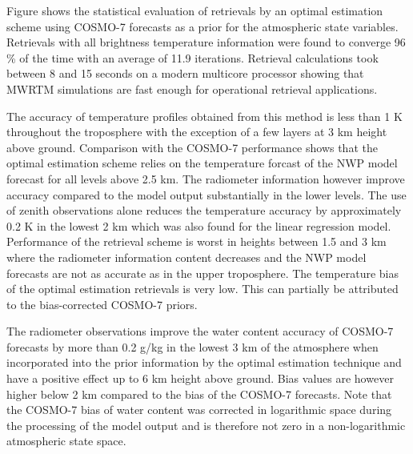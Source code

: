 \stopsubsection

\startsubsection[title={Optimal Estimation Retrievals with COSMO-7 Prior}]

    Figure  shows the statistical evaluation of retrievals
    by an optimal estimation scheme using COSMO-7 forecasts as a prior for
    the atmospheric state variables. Retrievals with all brightness temperature
    information were found to converge 96 \% of the time with an average of
    11.9 iterations. Retrieval calculations took between 8 and 15 seconds on a
    modern multicore processor showing that MWRTM simulations are fast enough
    for operational retrieval applications.

        {}

    The accuracy of temperature profiles obtained from this method is less than
    1 K throughout the troposphere with the exception of a few layers at 3 km
    height above ground. Comparison with the COSMO-7 performance shows that
    the optimal estimation scheme relies on the temperature forcast of the NWP
    model forecast for all levels above 2.5 km. The radiometer information
    however improve accuracy compared to the model output substantially in the
    lower levels. The use of zenith observations alone reduces the temperature
    accuracy by approximately 0.2 K in the lowest 2 km which was also found
    for the linear regression model. Performance of the retrieval scheme is
    worst in heights between 1.5 and 3 km where the radiometer information
    content decreases and the NWP model forecasts are not as accurate as in
    the upper troposphere. The temperature bias of the optimal estimation
    retrievals is very low. This can partially be attributed to the
    bias-corrected COSMO-7 priors.

    The radiometer observations improve the water content accuracy of COSMO-7
    forecasts by more than 0.2 g/kg in the lowest 3 km of the atmosphere when
    incorporated into the prior information by the optimal estimation technique
    and have a positive effect up to 6 km height above ground. Bias values are
    however higher below 2 km compared to the bias of the COSMO-7 forecasts.
    Note that the COSMO-7 bias of water content was corrected in logarithmic
    space during the processing of the model output and is therefore not zero
    in a non-logarithmic atmospheric state space.

